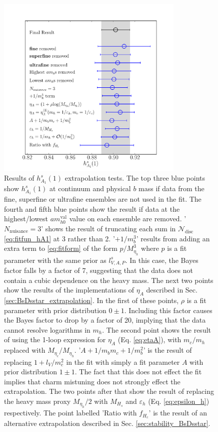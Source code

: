 \begin{figure}%
  \begin{center}
  \hspace{-18pt}
  \includegraphics[width=0.8\textwidth]{images/BsDsstar/hA1vsmh_fittests.pdf}
  
  \caption{Results of $h_{A_1}^s(1)$ extrapolation tests. The top three blue points show $h_{A_1}^s(1)$ at continuum and physical $b$ mass if data from the fine, superfine or ultrafine ensembles are not used in the fit.
    The fourth and fifth blue points show the result if data at the highest/lowest $am_{h0}^{\text{val}}$ value on each ensemble are removed.
    '$N_{\text{nuisance}}=3$' shows the result of truncating each sum in $\mathcal{N}_{\text{disc}}$ \eqref{eq:fitfun_hA1} at 3 rather than 2.
    '$+1/m_b^3$' results from adding an extra term to \eqref{eq:fitform} of the form $p/M_{\eta_h}^3$ where $p$ is a fit parameter with the same prior as $l_{V,A,P}^s$. In this case, the Bayes factor falls by a factor of 7, suggesting that the data does not contain a cubic dependence on the heavy mass.
    The next two points show the results of the implementations of $\eta_A$ described in Sec. \ref{sec:BsDsstar_extrapolation}. In the first of these points, $\rho$ is a fit parameter with prior distribution $0\pm 1$. Including this factor causes the Bayes factor to drop by a factor of 20, implying that the data cannot resolve logarithms in $m_h$. The second point shows the result of using the 1-loop expression for $\eta_A$ (Eq. \eqref{eq:etaA}), with $m_c/m_h$ replaced with $M_{\eta_c}/M_{\eta_h}$.
    '$A+1/m_bm_c+1/m_b^2$' is the result of replacing $1+l_V/m_c^2$ in the fit with simply a fit parameter $A$ with prior distribution $1\pm 1$. The fact that this does not effect the fit implies that charm mistuning does not strongly effect the extrapolation.
    The two points after that show the result of replacing the heavy mass proxy $M_{\eta_h}/2$ with $M_{H_s}$ and $\varepsilon_h$ (Eq. \eqref{eq:epsilon_h}) respectively.
    The point labelled 'Ratio with $f_{H_c}$' is the result of an alternative extrapolation described in Sec. \ref{sec:stability_BsDsstar}.  \label{fig:fittests_hA1}}
    \end{center}
\end{figure}



